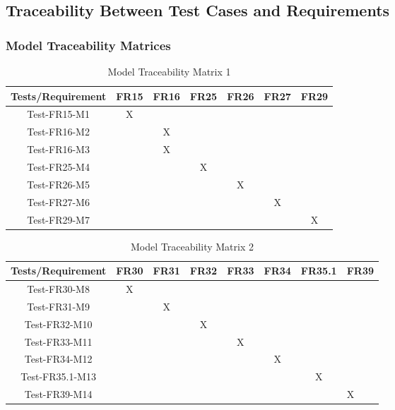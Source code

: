 \documentclass[12pt]{article}
\begin{document}
\subsection{Traceability Between Test Cases and Requirements}
\subsubsection{Model Traceability Matrices}
\begin{table}[htp]
\centering
\caption{Model Traceability Matrix 1}
\begin{tabular}{|c|c|c|c|c|c|c|}
\hline
Tests/Requirement & FR15 & FR16 & FR25 & FR26 & FR27 & FR29 \\
\hline
Test-FR15-M1      & X    &      &      &      &      &      \\
\hline
Test-FR16-M2      &      & X    &      &      &      &      \\
\hline
Test-FR16-M3      &      & X    &      &      &      &      \\
\hline
Test-FR25-M4      &      &      & X    &      &      &      \\
\hline
Test-FR26-M5      &      &      &      & X    &      &      \\
\hline
Test-FR27-M6      &      &      &      &      & X    &      \\
\hline
Test-FR29-M7      &      &      &      &      &      & X\\
\hline   
\end{tabular}
\end{table}
\begin{table}[htp]
\centering
\caption{Model Traceability Matrix 2}
\begin{tabular}{|c|c|c|c|c|c|c|l|}
\hline
Tests/Requirement & FR30 & FR31 & FR32 & FR33 & FR34 & FR35.1 & FR39 \\
\hline
Test-FR30-M8      & X    &      &      &      &      &        &      \\
\hline
Test-FR31-M9      &      & X    &      &      &      &        &      \\
\hline
Test-FR32-M10     &      &      & X    &      &      &        &      \\
\hline
Test-FR33-M11     &      &      &      & X    &      &        &      \\
\hline
Test-FR34-M12     &      &      &      &      & X    &        &      \\
\hline
Test-FR35.1-M13   &      &      &      &      &      & X      &      \\
\hline
Test-FR39-M14     &      &      &      &      &      &        & X   \\
\hline
\end{tabular}
\end{table}
\newpage
\end{document}
